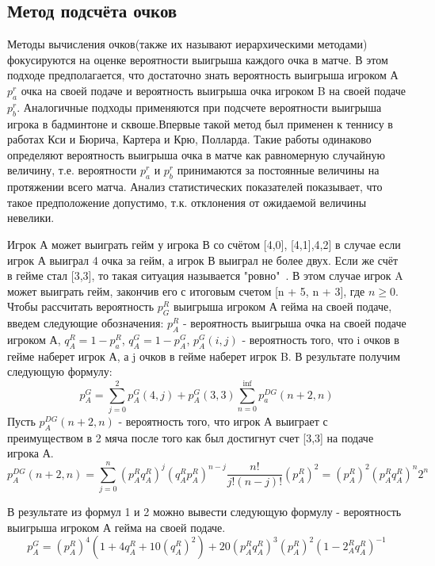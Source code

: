 \subsection{Метод подсчёта очков}
Методы вычисления очков(также их называют иерархическими методами) фокусируются на оценке вероятности выигрыша каждого очка в матче. 
В этом подходе предполагается, что достаточно знать вероятность выигрыша игроком А $p_a^r$ очка на своей подаче и вероятность выигрыша очка игроком B на своей подаче $p_b^r$. Аналогичные подходы  применяются при подсчете вероятности выигрыша игрока в бадминтоне\cite{Book19} и сквоше\cite{Book20}.Впервые такой метод был применен к теннису в работах Кси и Бюрича\cite{Book21}, Картера и Крю\cite{Book22}, Полларда\cite{Book23}.
Такие работы одинаково определяют вероятность выигрыша очка в матче как равномерную случайную величину, т.е. вероятности  $p_a^r$ и  $p_b^r$ принимаются за постоянные величины на протяжении всего матча. Анализ статистических показателей показывает, что такое предположение допустимо\cite{Book09}, т.к. отклонения от ожидаемой величины невелики.

Игрок А может выиграть гейм у игрока В со счётом [4,0], [4,1],4,2] в случае если игрок А выиграл 4 очка за гейм, а игрок В выиграл не более двух. Если же счёт в гейме стал [3,3], то такая ситуация называется "ровно"\ . В этом случае игрок A может выиграть гейм, закончив его с итоговым счетом [n + 5, n + 3], где $n\geq0$. Чтобы рассчитать вероятность $p_G^R$ выигрыша игроком А гейма на своей подаче, введем следующие обозначения: $p_A^R$ - вероятность выигрыша очка на своей подаче игроком А, $q_A^R=1-p_a^R$, $q_A^G = 1 - p_A^G$, $p_A^G(i,j)$ - вероятность того, что i очков в гейме наберет игрок А, а j очков в гейме наберет игрок B. В результате получим следующую формулу:
\begin{equation}
p_A^G=\sum\limits^{2}_{j=0}{p_A^G(4,j)  + p_A^G(3,3)\sum\limits^{\inf}_{n=0}p_a^{DG}(n + 2, n)}
\end{equation}
Пусть $p_A^{DG}(n + 2, n)$ - вероятность того, что игрок А выиграет с преимуществом в 2 мяча после того как был достигнут счет [3,3] на подаче игрока А.
\begin{equation}
p_A^{DG}(n+2,n)=\sum\limits^{n}_{j=0}{(p_A^Rq_A^R)^j(q^R_Ap^R_A)^{n-j}\frac{n!}{j!(n-j)!}}(p^R_A)^2=(p^R_A)^2(p^R_Aq^R_A)^n2^n
\end{equation}

В результате из формул 1 и 2 можно вывести следующую формулу -  вероятность выигрыша игроком А гейма на своей подаче.
\begin{equation}
p_A^{G} = (p^R_A)^4(1 + 4q^R_A + 10(q^R_A)^2) + 20(p^R_Aq^R_A)^3(p_A^R)^2(1 - 2_A^Rq^R_A)^{-1}
\end{equation} 


